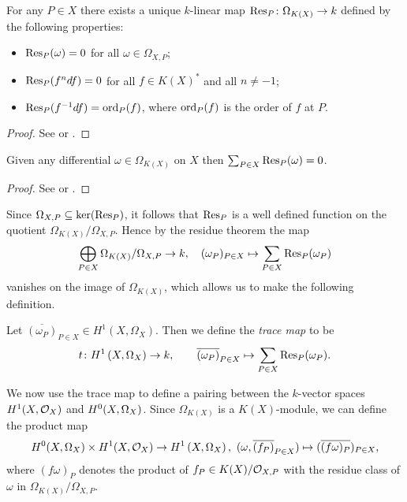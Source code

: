     \begin{thm}\label{theoremresiduemap}
    For any $P\in X$ there exists a unique $k$-linear map $\operatorname{Res}_P \colon \Omega_{K(X)} \rightarrow k$ defined by the following properties:
        \begin{itemize}
            \item $\operatorname{Res}_P(\omega) = 0$ for all $\omega \in \Omega_{X,P}$;
            \item $\operatorname{Res}_P(f^ndf) = 0$ for all $f \in K(X)^*$ and all $n \neq -1$;
            \item $\operatorname{Res}_P(f^{-1}df) = \operatorname{ord}_P(f)$, where $\operatorname{ord}_P(f)$ is the order of $f$ at $P$.
        \end{itemize}
    \end{thm}
    \begin{proof}
    See \cite[Chap.\ II, \S 7 and \S 11]{algebraicgroupsandclassfields} or \cite{residuesofdifferentialsoncurve}.
    \end{proof}


    \begin{thm}\label{theoremresiduetheorem}
    Given any differential $\omega \in \Omega_{K(X)}$ on $X$ then $\sum_{P \in X}\operatorname{Res}_P(\omega) = 0$.
    \end{thm}
    \begin{proof}
    See \cite[Chap.\ II, Prop.\ 6]{algebraicgroupsandclassfields} or \cite[Pg.\ 155]{residuesofdifferentialsoncurve}.
    \end{proof}

Since $\Omega_{X,P} \subseteq \ker (\operatorname{Res}_P)$, it follows that $\operatorname{Res}_P$ is a well defined function on the quotient $\Omega_{K(X)}/\Omega_{X,P}$.
Hence by the residue theorem the map
    \begin{equation*} 
    \bigoplus_{P \in X} \Omega_{K(X)}/\Omega_{X,P} \rightarrow k, \quad (\omega_P)_{P \in X} \mapsto \sum_{P\in X} \operatorname{Res}_P(\omega_P)
    \end{equation*} 
vanishes on the image of $\Omega_{K(X)}$, which allows us to make the following definition.
    
    \begin{defn}
    Let $\overline{(\omega_P)}_{P \in X} \in H^1(X,\Omega_X)$.
    Then we define the \emph{trace map} to be 
        \[
    t \colon H^1\left(X, \Omega_X\right) \rightarrow k, \qquad \overline{(\omega_P)}_{P \in X}  \mapsto \sum_{P \in X} \operatorname{Res}_P(\omega_P).
        \]
    \end{defn}

We now use the trace map to define a pairing between the $k$-vector spaces $H^1(X,\mathcal{O}_X)$ and ${H^0(X,\Omega_X)}$.
Since $\Omega_{K(X)}$ is a $K(X)$-module, we can define the product map 
    \begin{equation}\label{equationproductmap}
    {H^0(X,\Omega_X)} \times H^1(X,\mathcal{O}_X) \rightarrow H^1\left(X, \Omega_X\right), \ (\omega, \overline{(f_P)}_{P \in X}) \mapsto ( \overline {(f  \omega)_P})_{P \in X},
    \end{equation}
where $(f\omega)_P$ denotes the product of $f_P \in K(X)/{\cal O}_{X,P}$ with the residue class of $\omega$ in $\Omega_{K(X)}/\Omega_{X,P}$.


